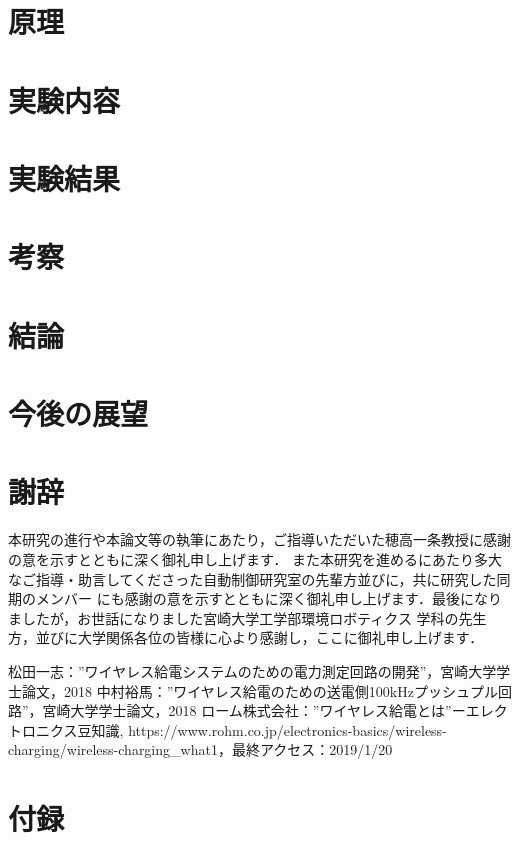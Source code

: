 \documentclass[12pt]{jarticle}
\begin{document}
\section{原理}

\section{実験内容}

\section{実験結果}

\section{考察}

\section{結論}

\section{今後の展望}

\clearpage
\section{謝辞}
 本研究の進行や本論文等の執筆にあたり，ご指導いただいた穂高一条教授に感謝の意を示すとともに深く御礼申し上げます．
また本研究を進めるにあたり多大なご指導・助言してくださった自動制御研究室の先輩方並びに，共に研究した同期のメンバー
にも感謝の意を示すとともに深く御礼申し上げます．最後になりましたが，お世話になりました宮崎大学工学部環境ロボティクス
学科の先生方，並びに大学関係各位の皆様に心より感謝し，ここに御礼申し上げます．

\begin{thebibliography}{50}
	松田一志：”ワイヤレス給電システムのための電力測定回路の開発”，宮崎大学学士論文，2018
	中村裕馬：”ワイヤレス給電のための送電側100kHzプッシュプル回路”，宮崎大学学士論文，2018
	  ローム株式会社：”ワイヤレス給電とは”ーエレクトロニクス豆知識, https://www.rohm.co.jp/electronics-basics/wireless-charging/wireless-charging\_what1，最終アクセス：2019/1/20	
\end{thebibliography}
\clearpage
\section{付録}
\end{document}
